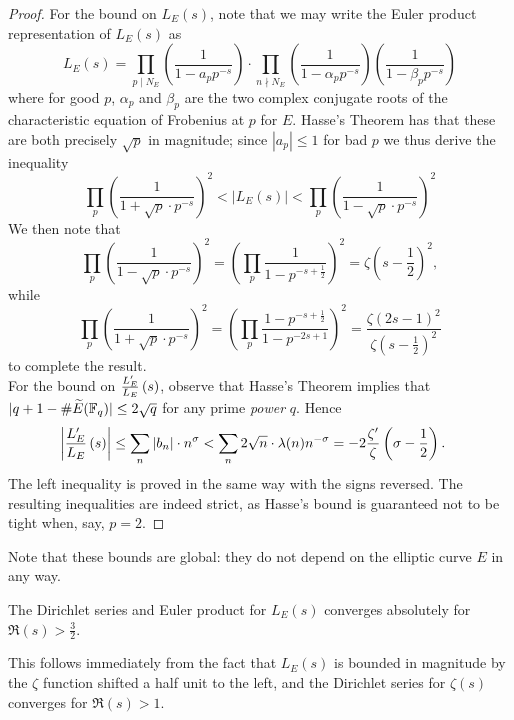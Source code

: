 \begin{proof}
For the bound on $L_E(s)$, note that we may write the Euler product representation of $L_E(s)$ as
\begin{equation}
L_E(s) = \prod_{p \mid N_E} \left(\frac{1}{1-a_p p^{-s}}\right) \cdot \prod_{n \nmid N_E} \left(\frac{1}{1-\alpha_p p^{-s}}\right)\left(\frac{1}{1-\beta_p p^{-s}}\right)
\end{equation}
where for good $p$, $\alpha_p$ and $\beta_p$ are the two complex conjugate roots of the characteristic equation of Frobenius at $p$ for $E$. Hasse's Theorem has that these are both precisely $\sqrt{p}$ in magnitude; since $|a_p|\le 1$ for bad $p$ we thus derive the inequality
\begin{equation}
\prod_p \left(\frac{1}{1+ \sqrt{p}\cdot p^{-s}}\right)^2 < \left|L_E(s)\right| < \prod_p \left(\frac{1}{1- \sqrt{p}\cdot p^{-s}}\right)^2
\end{equation}
We then note that 
\[ \prod_p \left(\frac{1}{1- \sqrt{p}\cdot p^{-s}}\right)^2 = \left(\prod_p \frac{1}{1- p^{-s+\frac{1}{2}}}\right)^2 = \zeta(s-\frac{1}{2})^2,\] 
while
\[ \prod_p \left(\frac{1}{1+ \sqrt{p}\cdot p^{-s}}\right)^2 = \left(\prod_p \frac{1- p^{-s+\frac{1}{2}}}{1- p^{-2s+1}}\right)^2 = \frac{\zeta(2s-1)^2}{\zeta(s-\frac{1}{2})^2}\]
to complete the result. \\ 

For the bound on $\frac{L_E^{\prime}}{L_E}\left(s\right)$, observe that Hasse's Theorem implies that $|q + 1 - \#\widetilde{E}(\mathbb{F}_{q})| \le 2\sqrt{q}$ for any prime {\it power} $q$. Hence
\begin{align*}
\left| \frac{L_E^{\prime}}{L_E}\left(s\right)\right| &\le \sum_n |b_n| \cdot n^\sigma < \sum_{n} 2\sqrt{n} \cdot \lambda(n) n^{-\sigma}  = -2\frac{\zeta^{\prime}}{\zeta}\left(\sigma-\frac{1}{2}\right).
\end{align*}
The left inequality is proved in the same way with the signs reversed. The resulting inequalities are indeed strict, as Hasse's bound is guaranteed not to be tight when, say, $p=2$.
\end{proof}
Note that these bounds are global: they do not depend on the elliptic curve $E$ in any way.

\begin{corollary}\label{cor:L_E_abs_convergence}
The Dirichlet series and Euler product for $L_E(s)$ converges absolutely for $\Re(s)>\frac{3}{2}$.
\end{corollary}
This follows immediately from the fact that $L_E(s)$ is bounded in magnitude by the $\zeta$ function shifted a half unit to the left, and the Dirichlet series for $\zeta(s)$ converges for $\Re(s)>1$.

